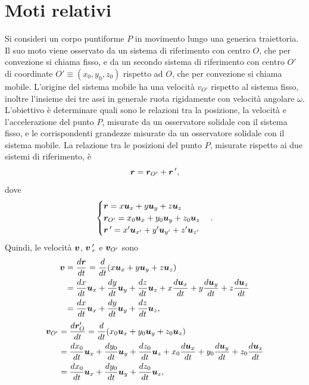 \chapter{Moti relativi}
Si consideri un corpo puntiforme $P$ in movimento lungo una generica traiettoria. Il suo moto viene osservato da un sistema di riferimento con centro $O$, che per convezione si chiama fisso, e da un secondo sistema di riferimento con centro $O'$ di coordinate $O'\equiv(x_0,y_0,z_0)$ rispetto ad $O$, che per convezione si chiama mobile. L'origine del sistema mobile ha una velocità $v_{O'}$ rispetto al sistema fisso, inoltre l'insieme dei tre assi in generale ruota rigidamente con velocità angolare $\omega$. L'obiettivo è determinare quali sono le relazioni tra la posizione, la velocità e l'accelerazione del punto $P$, misurate da un osservatore solidale con il sistema fisso, e le corrispondenti grandezze misurate da un osservatore solidale con il sistema mobile. La relazione tra le posizioni del punto $P$, misurate rispetto ai due sistemi di riferimento, è
\begin{equation}
    \bm{r}=\bm{r}_{O'}+\bm{r}\,',
\end{equation}
dove
\begin{equation}
    \begin{cases}
        \bm{r}=x\bm{u}_x+y\bm{u}_y+z\bm{u}_z \\
        \bm{r}_{O'}=x_0\bm{u}_x+y_0\bm{u}_y+z_0\bm{u}_z \\
        \bm{r}\,'=x'\bm{u}_{x'}+y'\bm{u}_{y'}+z'\bm{u}_{z'} \\
    \end{cases}.
\end{equation}
Quindi, le velocità $\bm{v}$, $\bm{v}\,'_r$ e $\bm{v}_{O'}$ sono
\begin{equation}
    \begin{split}
        \bm{v}&=\frac{d\bm{r}}{dt}=\frac{d}{dt}(x\bm{u}_x+y\bm{u}_y+z\bm{u}_z) \\
        &=\frac{dx}{dt}\bm{u}_x+\frac{dy}{dt}\bm{u}_y+\frac{dz}{dt}\bm{u}_z+x\frac{d\bm{u}_x}{dt}+y\frac{d\bm{u}_y}{dt}+z\frac{d\bm{u}_z}{dt}\\
        &=\frac{dx}{dt}\bm{u}_x+\frac{dy}{dt}\bm{u}_y+\frac{dz}{dt}\bm{u}_z,
    \end{split}
\end{equation}
\begin{equation}
    \begin{split}
        \bm{v}_{O'}&=\frac{d\bm{r}_O'}{dt}=\frac{d}{dt}(x_0\bm{u}_x+y_0\bm{u}_y+z_0\bm{u}_z) \\
        &=\frac{dx_0}{dt}\bm{u}_x+\frac{dy_0}{dt}\bm{u}_y+\frac{dz_0}{dt}\bm{u}_z+x_0\frac{d\bm{u}_x}{dt}+y_0\frac{d\bm{u}_y}{dt}+z_0\frac{d\bm{u}_z}{dt} \\
        &=\frac{dx_0}{dt}\bm{u}_x+\frac{dy_0}{dt}\bm{u}_y+\frac{dz_0}{dt}\bm{u}_z,
    \end{split}   
\end{equation}
